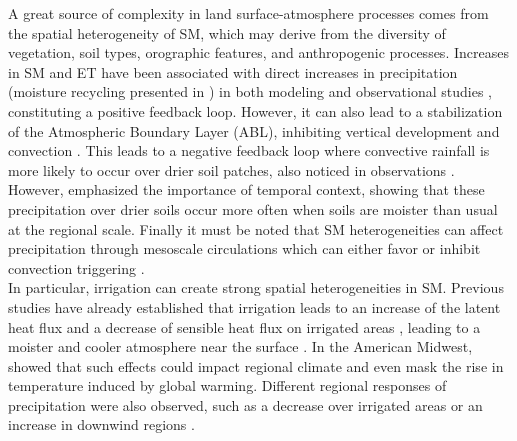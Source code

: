 A great source of complexity in land surface-atmosphere processes comes from the spatial heterogeneity of SM, which may derive from the diversity of vegetation, soil types, orographic features, and anthropogenic processes.
Increases in SM and ET have been associated with direct increases in precipitation (moisture recycling presented in \citet{eltahir_precipitation_1996}) in both modeling and observational studies \citep{koster_observational_2003, guo_glace_2006, wei_dissecting_2012, findell_probability_2011}, constituting a positive feedback loop. However, it can also lead to a stabilization of the Atmospheric Boundary Layer (ABL), inhibiting vertical development and convection \citep{findell_atmospheric_2003-1, ek_influence_2004}. This leads to a negative feedback loop where convective rainfall is more likely to occur over drier soil patches, also noticed in observations \citep{taylor_afternoon_2012, klein_dry_2020}. However, \citet{guillod_reconciling_2015} emphasized the importance of temporal context, showing that these precipitation over drier soils occur more often when soils are moister than usual at the regional scale.
Finally it must be noted that SM heterogeneities can affect precipitation through mesoscale circulations which can either favor or inhibit convection triggering \citep{findell_atmospheric_2003, taylor_frequency_2011, rochetin_morphology_2017}.\\

In particular, irrigation can create strong spatial heterogeneities in SM. Previous studies have already established that irrigation leads to an increase of the latent heat flux and a decrease of sensible heat flux on irrigated areas \citep{pokhrel_incorporating_2012}, leading to a moister and cooler atmosphere near the surface \citep{bonfils_empirical_2007}. 
In the American Midwest, \citet{nocco_observation_2019} showed that such effects could impact regional climate and even mask the rise in temperature induced by global warming. Different regional responses of precipitation were also observed, such as a decrease over irrigated areas \citep{alter_rainfall_2015} or an increase in downwind regions \citep{deangelis_evidence_2010}.

